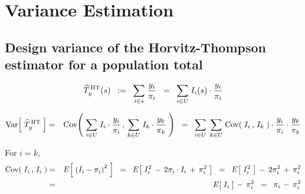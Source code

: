 

\section{Variance Estimation}
\setcounter{theorem}{0}
\setcounter{equation}{0}


\renewcommand{\theenumi}{\roman{enumi}}
\renewcommand{\labelenumi}{\textnormal{(\theenumi)}$\;\;$}


\subsection{Design variance of the Horvitz-Thompson estimator for a population total}

\begin{equation*}
\widehat{T}^{\,\textnormal{HT}}_{y}(s)
\;\; := \;\;
	\underset{i \in s}{\sum}\; \dfrac{y_{i}}{\pi_{i}}
\;\; = \;\;
	\underset{i \in U}{\sum}\; I_{i}(s)\cdot\dfrac{y_{i}}{\pi_{i}}
\end{equation*}

\begin{eqnarray*}
\textnormal{Var}\!\left[\;\widehat{T}^{\,\textnormal{HT}}_{y}\;\right]
& = &
	\textnormal{Cov}\!\left(\;
		\underset{i \in U}{\sum}\; I_{i}\cdot\dfrac{y_{i}}{\pi_{i}}
		\,,\,
		\underset{k \in U}{\sum}\; I_{k}\cdot\dfrac{y_{k}}{\pi_{k}}
		\;\right)
\;\; = \;\;
	\underset{i \in U}{\sum}\;\,
	\underset{k \in U}{\sum}\;
		\textnormal{Cov}\!\left(\;I_{i}\,,\,I_{k}\;\right)
		\cdot\dfrac{y_{i}}{\pi_{i}}
		\cdot\dfrac{y_{k}}{\pi_{k}}
\end{eqnarray*}

\noindent
For $i = k$,
\begin{eqnarray*}
\textnormal{Cov}\!\left(\;I_{i}\,,\,I_{i}\;\right)
& = &
	E\!\left[\;\left(I_{i}-\pi_{i}\right)^{2}\;\right]
\;\; = \;\;
	E\!\left[\;I_{i}^{2} \, - \, 2\pi_{i} \cdot I_{i} \,+\, \pi_{i}^{2}\;\right]
\;\; = \;\;
	E\!\left[\;I_{i}^{2}\;\right] \, - \, 2\pi_{i}^{2} \,+\, \pi_{i}^{2}
\\
& = &
	E\!\left[\;I_{i}\;\right] \, - \,\pi_{i}^{2}
\;\; = \;\;
	\pi_{i} \, - \,\pi_{i}^{2}
\end{eqnarray*}

